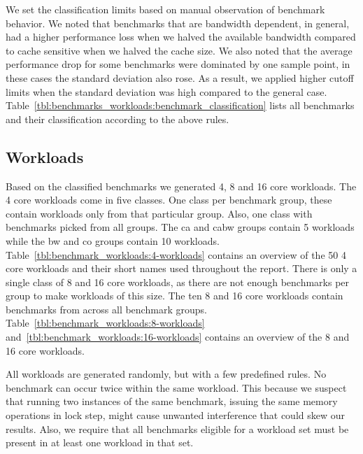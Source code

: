 We set the classification limits based on manual observation of benchmark behavior. 
We noted that benchmarks that are bandwidth dependent, in general, had a higher performance loss when we halved the available bandwidth compared to cache sensitive when we halved the cache size.
We also noted that the average performance drop for some benchmarks were dominated by one sample point, in these cases the standard deviation also rose. 
As a result, we applied higher cutoff limits when the standard deviation was high compared to the general case.
Table~\ref{tbl:benchmarks_workloads:benchmark_classification} lists all benchmarks and their classification according to the above rules.


\subsection{Workloads}
\label{sec:methodology:benchmarks:workloads}

Based on the classified benchmarks we generated 4, 8 and 16 core workloads.
The 4 core workloads come in five classes.
One class per benchmark group, these contain workloads only from that particular group.
Also, one class with benchmarks picked from all groups.
The ca and cabw groups contain 5 workloads while the bw and co groups contain 10 workloads.
Table~\ref{tbl:benchmark_workloads:4-workloads} contains an overview of the 50 4 core workloads and their short names used throughout the report.
There is only a single class of 8 and 16 core workloads, as there are not enough benchmarks per group to make workloads of this size. 
The ten 8 and 16 core workloads contain benchmarks from across all benchmark groups.
Table~\ref{tbl:benchmark_workloads:8-workloads} and~\ref{tbl:benchmark_workloads:16-workloads} contains an overview of the 8 and 16 core workloads.

All workloads are generated randomly, but with a few predefined rules.
No benchmark can occur twice within the same workload.
This because we suspect that running two instances of the same benchmark, issuing the same memory operations in lock step, might cause unwanted interference that could skew our results. 
Also, we require that all benchmarks eligible for a workload set must be present in at least one workload in that set.